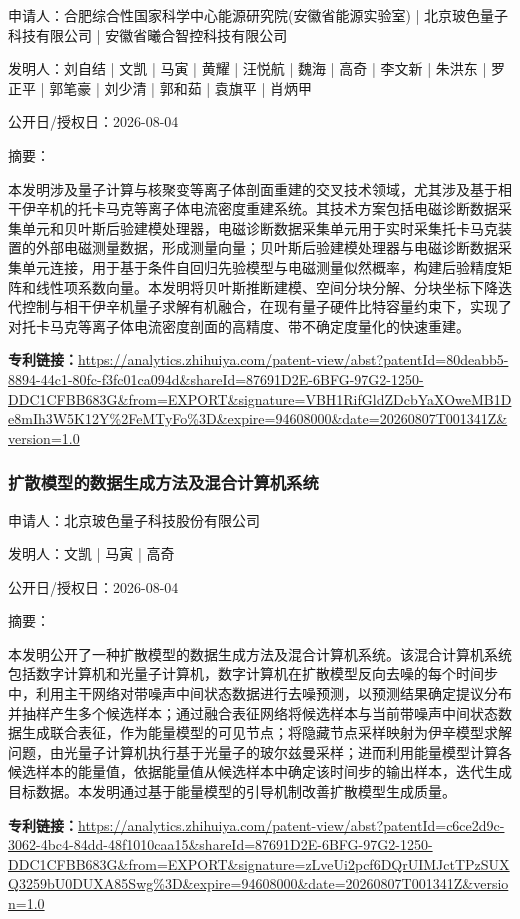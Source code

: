 \documentclass[12pt,a4paper]{ctexart}
\begin{document}
申请人：合肥综合性国家科学中心能源研究院(安徽省能源实验室) | 北京玻色量子科技有限公司 | 安徽省曦合智控科技有限公司

发明人：刘自结 | 文凯 | 马寅 | 黄耀 | 汪悦航 | 魏海 | 高奇 | 李文新 | 朱洪东 | 罗正平 | 郭笔豪 | 刘少清 | 郭和茹 | 袁旗平 | 肖炳甲

公开日/授权日：2026-08-04

摘要：

本发明涉及量子计算与核聚变等离子体剖面重建的交叉技术领域，尤其涉及基于相干伊辛机的托卡马克等离子体电流密度重建系统。其技术方案包括电磁诊断数据采集单元和贝叶斯后验建模处理器，电磁诊断数据采集单元用于实时采集托卡马克装置的外部电磁测量数据，形成测量向量；贝叶斯后验建模处理器与电磁诊断数据采集单元连接，用于基于条件自回归先验模型与电磁测量似然概率，构建后验精度矩阵和线性项系数向量。本发明将贝叶斯推断建模、空间分块分解、分块坐标下降迭代控制与相干伊辛机量子求解有机融合，在现有量子硬件比特容量约束下，实现了对托卡马克等离子体电流密度剖面的高精度、带不确定度量化的快速重建。

\noindent\textbf{专利链接：}\url{https://analytics.zhihuiya.com/patent-view/abst?patentId=80deabb5-8894-44c1-80fc-f3fc01ca094d&shareId=87691D2E-6BFG-97G2-1250-DDC1CFBB683G&from=EXPORT&signature=VBH1RifGldZDcbYaXOweMB1De8mIh3W5K12Y%2FeMTyFo%3D&expire=94608000&date=20260807T001341Z&version=1.0}

\subsubsection{ 扩散模型的数据生成方法及混合计算机系统 }

申请人：北京玻色量子科技股份有限公司

发明人：文凯 | 马寅 | 高奇

公开日/授权日：2026-08-04

摘要：

本发明公开了一种扩散模型的数据生成方法及混合计算机系统。该混合计算机系统包括数字计算机和光量子计算机，数字计算机在扩散模型反向去噪的每个时间步中，利用主干网络对带噪声中间状态数据进行去噪预测，以预测结果确定提议分布并抽样产生多个候选样本；通过融合表征网络将候选样本与当前带噪声中间状态数据生成联合表征，作为能量模型的可见节点；将隐藏节点采样映射为伊辛模型求解问题，由光量子计算机执行基于光量子的玻尔兹曼采样；进而利用能量模型计算各候选样本的能量值，依据能量值从候选样本中确定该时间步的输出样本，迭代生成目标数据。本发明通过基于能量模型的引导机制改善扩散模型生成质量。

\noindent\textbf{专利链接：}\url{https://analytics.zhihuiya.com/patent-view/abst?patentId=c6ce2d9c-3062-4bc4-84dd-48f1010caa15&shareId=87691D2E-6BFG-97G2-1250-DDC1CFBB683G&from=EXPORT&signature=zLveUi2pcf6DQrUIMJctTPzSUXQ3259bU0DUXA85Swg%3D&expire=94608000&date=20260807T001341Z&version=1.0}
\end{document}
